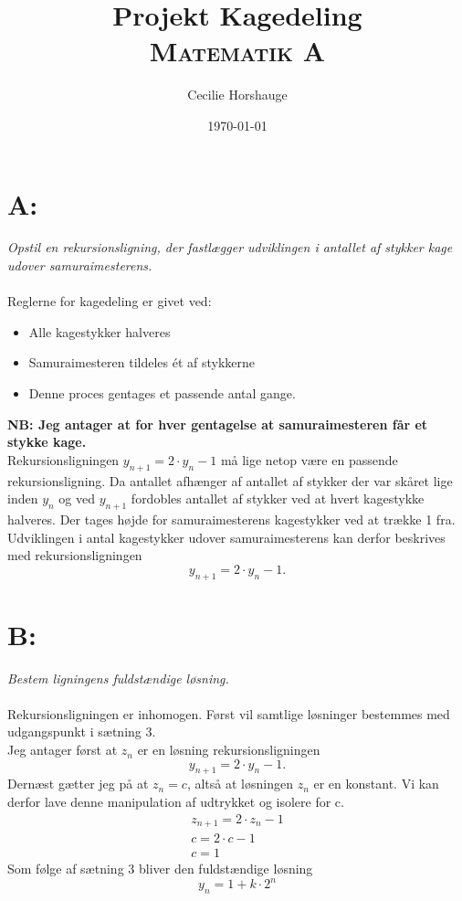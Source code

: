 \documentclass[a4paper, 11pt]{article}
\title{Projekt Kagedeling\\{\large \textsc{Matematik A}}}
\author{Cecilie Horshauge}
\date{\today}
\begin{document}
\maketitle

\section*{A:}
\textit{Opstil en rekursionsligning, der fastlægger udviklingen i antallet af stykker kage udover samuraimesterens.}\\\\
Reglerne for kagedeling er givet ved:
\begin{itemize}
    \item Alle kagestykker halveres
    \item Samuraimesteren tildeles ét af stykkerne
    \item Denne proces gentages et passende antal gange.
\end{itemize}
\textbf{NB: Jeg antager at for hver gentagelse at samuraimesteren får et stykke kage.}\\
Rekursionsligningen \(y_{n+1}=2 \cdot y_n -1\) må lige netop være en passende rekursionsligning. 
Da antallet afhænger af antallet af stykker der var skåret lige inden \(y_n\) og ved \(y_{n+1}\) fordobles antallet af stykker ved at hvert kagestykke halveres. Der tages højde for samuraimesterens kagestykker ved at trække 1 fra.\\
Udviklingen i antal kagestykker udover samuraimesterens kan derfor beskrives med rekursionsligningen
\[y_{n+1}=2 \cdot y_n -1.\]
\clearpage
\section*{B:}
\textit{Bestem ligningens fuldstændige løsning.}\\\\
Rekursionsligningen er inhomogen. Først vil samtlige  løsninger bestemmes med udgangspunkt i sætning 3.\\
Jeg antager først at \(z_n\) er en løsning rekursionsligningen
\[y_{n+1}=2 \cdot y_n -1.\]
Dernæst gætter jeg på at \(z_n=c\), altså at løsningen \(z_n\) er en konstant. Vi kan derfor lave denne manipulation af udtrykket og isolere for c.
\begin{align*}
    z_{n+1}=2 \cdot z_n -1\\
    c=2 \cdot c -1\\
    c=1
\end{align*}
Som følge af sætning 3 bliver den fuldstændige løsning
\[y_{n}=1+k \cdot 2^n\] 
\end{document}
